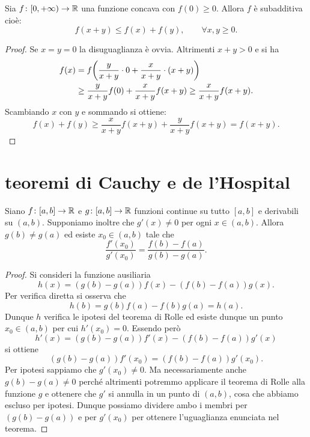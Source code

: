 \begin{exercise}
Sia $f\colon [0,+\infty) \to \mathbb R$ una funzione concava con $f(0)\ge 0$. Allora $f$ è subadditiva cioè:
\[
  f(x+y) \le f(x) + f(y),\qquad \forall x,y\ge 0.
\]
\end{exercise}
%
\begin{proof}
Se $x=y=0$ la disuguaglianza è ovvia.
Altrimenti $x+y>0$ e si ha
\begin{align*}
f(x) &= f{\left( \frac{y}{x+y}\cdot 0 + \frac{x}{x+y}\cdot (x+y) \right)}\\ &\ge \frac{y}{x+y}f(0) + \frac{x}{x+y}f(x+y)
\ge \frac{x}{x+y}f(x+y).
\end{align*}
Scambiando $x$ con $y$ e sommando si ottiene:
\[
  f(x) + f(y) \ge \frac{x}{x+y}f(x+y) + \frac{y}{x+y}f(x+y) = f(x+y).
\]
\end{proof}

\section{teoremi di Cauchy e de l'Hospital}

\begin{theorem}[Cauchy]
\label{th:cauchy}%
\mymark{**}%
%
%
Siano $f\colon[a,b]\to \mathbb R$ e $g\colon[a,b]\to \mathbb R$ funzioni continue su tutto $[a,b]$ e derivabili su $(a,b)$.
Supponiamo inoltre che $g'(x)\neq 0$ per ogni $x\in (a,b)$.
Allora $g(b) \neq g(a)$ ed esiste $x_0\in(a,b)$ tale che
\[
  \frac{f'(x_0)}{g'(x_0)} = \frac{f(b)-f(a)}{g(b)-g(a)}.
\]
\end{theorem}
%
\begin{proof}
\mymark{**}
Si consideri la funzione ausiliaria
\[
 h(x) = (g(b)-g(a))f(x) - (f(b)-f(a))g(x).
\]
Per verifica diretta si osserva che
\[
  h(b) = g(b)f(a) - f(b)g(a) = h(a).
\]
Dunque $h$ verifica le ipotesi del teorema di Rolle ed esiste
dunque un punto $x_0\in(a,b)$ per cui $h'(x_0) = 0$.
Essendo però
\[
  h'(x) = (g(b) - g(a)) f'(x) - (f(b)-f(a)) g'(x)
\]
si ottiene
\[
 (g(b)-g(a))f'(x_0) = (f(b) - f(a))g'(x_0).
\]
Per ipotesi sappiamo che $g'(x_0)\neq 0$.
Ma necessariamente anche $g(b) - g(a)\neq 0$ perché altrimenti potremmo applicare il teorema di Rolle alla funzione $g$ e ottenere che $g'$ si annulla in un punto di $(a,b)$, cosa che abbiamo escluso per ipotesi.
Dunque possiamo dividere ambo i membri per $(g(b)-g(a))$ e per $g'(x_0)$ per ottenere l'uguaglianza enunciata nel teorema.
\end{proof}

